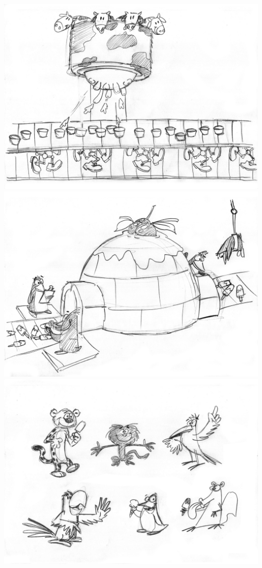 \documentclass{sigchi}
\begin{document}
\begin{center}
        \includegraphics[width=0.9\columnwidth]{04}
        \includegraphics[width=0.9\columnwidth]{05}
        \includegraphics[width=0.9\columnwidth]{06}
    \end{center}
\end{document}
